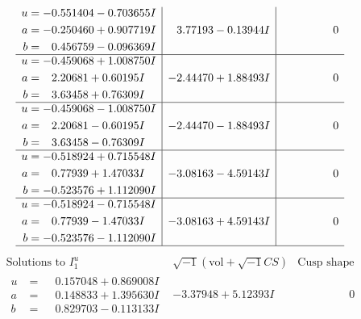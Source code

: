 \documentclass[1p]{elsarticle_modified}
\theoremstyle{definition}
\newcommand{\I}{\sqrt{-1}}
\begin{document}
$$\begin{array}{c|c|c}
\begin{aligned}
u &= -0.551404 - 0.703655 I \\
a &= -0.250460 + 0.907719 I \\
b &= \phantom{-}0.456759 - 0.096369 I\end{aligned}
 & \phantom{-}3.77193 - 0.13944 I & \phantom{-0.000000 } 0 \\ \hline\begin{aligned}
u &= -0.459068 + 1.008750 I \\
a &= \phantom{-}2.20681 + 0.60195 I \\
b &= \phantom{-}3.63458 + 0.76309 I\end{aligned}
 & -2.44470 + 1.88493 I & \phantom{-0.000000 } 0 \\ \hline\begin{aligned}
u &= -0.459068 - 1.008750 I \\
a &= \phantom{-}2.20681 - 0.60195 I \\
b &= \phantom{-}3.63458 - 0.76309 I\end{aligned}
 & -2.44470 - 1.88493 I & \phantom{-0.000000 } 0 \\ \hline\begin{aligned}
u &= -0.518924 + 0.715548 I \\
a &= \phantom{-}0.77939 + 1.47033 I \\
b &= -0.523576 + 1.112090 I\end{aligned}
 & -3.08163 - 4.59143 I & \phantom{-0.000000 } 0 \\ \hline\begin{aligned}
u &= -0.518924 - 0.715548 I \\
a &= \phantom{-}0.77939 - 1.47033 I \\
b &= -0.523576 - 1.112090 I\end{aligned}
 & -3.08163 + 4.59143 I & \phantom{-0.000000 } 0\\
 \hline 
 \end{array}$$\newpage$$\begin{array}{c|c|c}  
\text{Solutions to }I^u_{1}& \I (\text{vol} + \sqrt{-1}CS) & \text{Cusp shape}\\
 \hline 
\begin{aligned}
u &= \phantom{-}0.157048 + 0.869008 I \\
a &= \phantom{-}0.148833 + 1.395630 I \\
b &= \phantom{-}0.829703 - 0.113133 I\end{aligned}
 & -3.37948 + 5.12393 I & \phantom{-0.000000 } 0 \\ \hline\begin{aligned}

\end{aligned}
\end{array}$$
\end{document}

